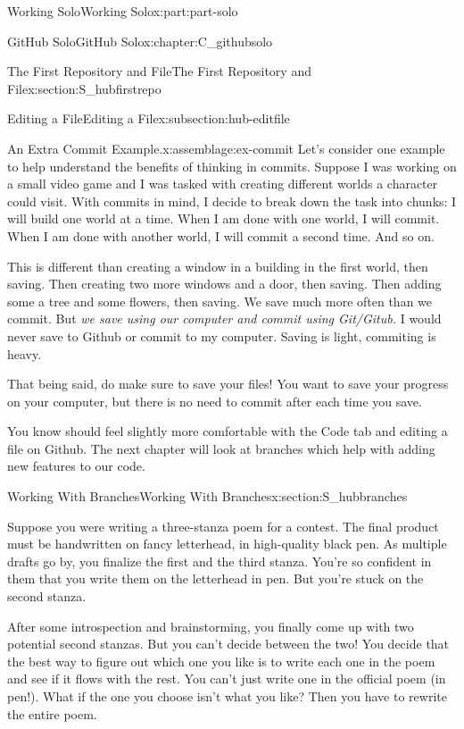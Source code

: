 \documentclass[oneside,10pt,]{book}
\begin{document}
\begin{partptx}{Working Solo}{}{Working Solo}{}{}{x:part:part-solo}
\begin{chapterptx}{GitHub Solo}{}{GitHub Solo}{}{}{x:chapter:C_githubsolo}
\begin{sectionptx}{The First Repository and File}{}{The First Repository and File}{}{}{x:section:S_hubfirstrepo}
\begin{subsectionptx}{Editing a File}{}{Editing a File}{}{}{x:subsection:hub-editfile}
\begin{assemblage}{An Extra Commit Example.}{x:assemblage:ex-commit}
Let's consider one example to help understand the benefits of thinking in commits. Suppose I was working on a small video game and I was tasked with creating different worlds a character could visit. With commits in mind, I decide to break down the task into chunks: I will build one world at a time. When I am done with one world, I will commit. When I am done with another world, I will commit a second time. And so on.%
\par
This is different than creating a window in a building in the first world, then saving. Then creating two more windows and a door, then saving. Then adding some a tree and some flowers, then saving. We save much more often than we commit. But \emph{we save using our computer and commit using Git\slash{}Gitub.} I would never save to Github or commit to my computer. Saving is light, commiting is heavy.%
\par
That being said, do make sure to save your files! You want to save your progress on your computer, but there is no need to commit after each time you save.%
\end{assemblage}
\end{subsectionptx}
\begin{conclusion}{}%
You know should feel slightly more comfortable with the Code tab and editing a file on Github. The next chapter will look at branches which help with adding new features to our code.%
\end{conclusion}%
\end{sectionptx}
%
%
\typeout{************************************************}
\typeout{************************************************}
%
\begin{sectionptx}{Working With Branches}{}{Working With Branches}{}{}{x:section:S_hubbranches}
%
%
\begin{introduction}{}%
Suppose you were writing a three-stanza poem for a contest. The final product must be handwritten on fancy letterhead, in high-quality black pen. As multiple drafts go by, you finalize the first and the third stanza. You're so confident in them that you write them on the letterhead in pen. But you're stuck on the second stanza.%
\par
After some introspection and brainstorming, you finally come up with two potential second stanzas. But you can't decide between the two! You decide that the best way to figure out which one you like is to write each one in the poem and see if it flows with the rest. You can't just write one in the official poem (in pen!). What if the one you choose isn't what you like? Then you have to rewrite the entire poem.%

\end{introduction}
\end{sectionptx}
\end{chapterptx}
\end{partptx}
\end{document}
